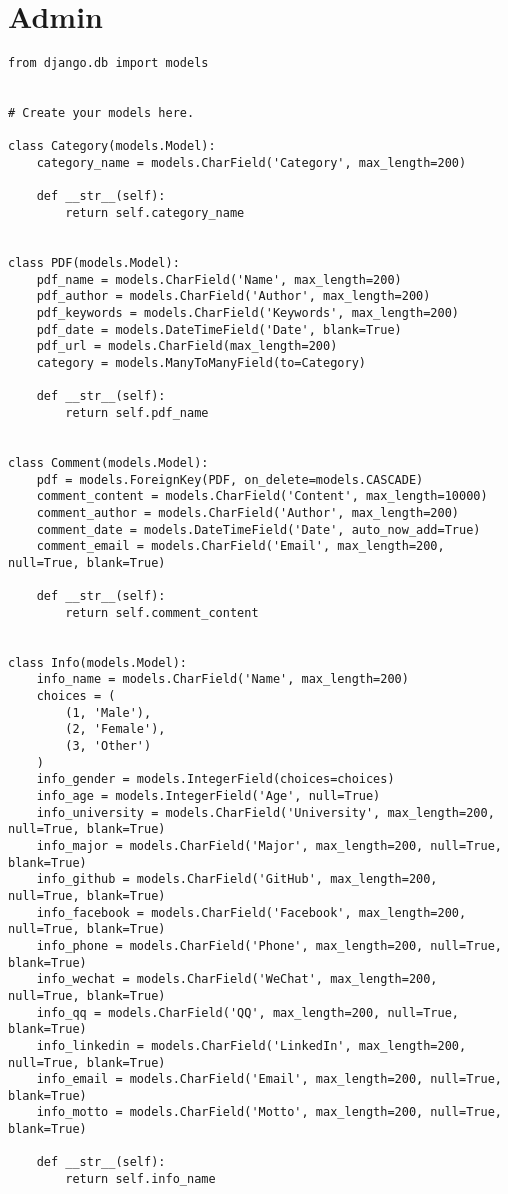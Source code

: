 
\chapter{Admin}
\lstset{language=Python}
\begin{lstlisting}
from django.db import models


# Create your models here.

class Category(models.Model):
    category_name = models.CharField('Category', max_length=200)

    def __str__(self):
        return self.category_name


class PDF(models.Model):
    pdf_name = models.CharField('Name', max_length=200)
    pdf_author = models.CharField('Author', max_length=200)
    pdf_keywords = models.CharField('Keywords', max_length=200)
    pdf_date = models.DateTimeField('Date', blank=True)
    pdf_url = models.CharField(max_length=200)
    category = models.ManyToManyField(to=Category)

    def __str__(self):
        return self.pdf_name


class Comment(models.Model):
    pdf = models.ForeignKey(PDF, on_delete=models.CASCADE)
    comment_content = models.CharField('Content', max_length=10000)
    comment_author = models.CharField('Author', max_length=200)
    comment_date = models.DateTimeField('Date', auto_now_add=True)
    comment_email = models.CharField('Email', max_length=200, null=True, blank=True)

    def __str__(self):
        return self.comment_content


class Info(models.Model):
    info_name = models.CharField('Name', max_length=200)
    choices = (
        (1, 'Male'),
        (2, 'Female'),
        (3, 'Other')
    )
    info_gender = models.IntegerField(choices=choices)
    info_age = models.IntegerField('Age', null=True)
    info_university = models.CharField('University', max_length=200, null=True, blank=True)
    info_major = models.CharField('Major', max_length=200, null=True, blank=True)
    info_github = models.CharField('GitHub', max_length=200, null=True, blank=True)
    info_facebook = models.CharField('Facebook', max_length=200, null=True, blank=True)
    info_phone = models.CharField('Phone', max_length=200, null=True, blank=True)
    info_wechat = models.CharField('WeChat', max_length=200, null=True, blank=True)
    info_qq = models.CharField('QQ', max_length=200, null=True, blank=True)
    info_linkedin = models.CharField('LinkedIn', max_length=200, null=True, blank=True)
    info_email = models.CharField('Email', max_length=200, null=True, blank=True)
    info_motto = models.CharField('Motto', max_length=200, null=True, blank=True)

    def __str__(self):
        return self.info_name

\end{lstlisting}